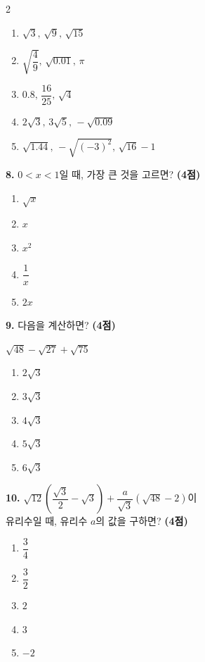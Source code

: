 \documentclass[a4paper,11pt]{article}
\newcommand{\choicenum}[1]{\textcircled{\small #1}}
\newcommand{\scorebox}[1]{\textbf{(#1점)}}
\newcommand{\qbox}[1]{%
  \begin{mdframed}[linewidth=0.8pt,innerleftmargin=6pt,innerrightmargin=6pt,innertopmargin=4pt,innerbottommargin=4pt]
  #1
  \end{mdframed}
}
\begin{document}
\begin{multicols}{2}
\begin{enumerate}[label=\protect\choicenum{\arabic*},leftmargin=*,itemsep=0pt]
  \item $\sqrt{3},\,\sqrt{9},\,\sqrt{15}$
  \item $\sqrt{\dfrac{4}{9}},\,\sqrt{0.01},\,\pi$
  \item $0.8,\,\dfrac{16}{25},\,\sqrt{4}$
  \item $2\sqrt{3},\,3\sqrt{5},\,-\sqrt{0.09}$
  \item $\sqrt{1.44},\,-\sqrt{(-3)^{2}},\,\sqrt{16}-1$
\end{enumerate}

\vspace{3mm}

\noindent\textbf{8.} $0<x<1$일 때, 가장 큰 것을 고르면? \scorebox{4}

\begin{enumerate}[label=\protect\choicenum{\arabic*},leftmargin=*,itemsep=0pt]
  \item $\sqrt{x}$
  \item $x$
  \item $x^{2}$
  \item $\dfrac{1}{x}$
  \item $2x$
\end{enumerate}

\vspace{3mm}

\noindent\textbf{9.} 다음을 계산하면? \scorebox{4}

\qbox{$\sqrt{48}-\sqrt{27}+\sqrt{75}$}

\begin{enumerate}[label=\protect\choicenum{\arabic*},leftmargin=*,itemsep=0pt]
  \item $2\sqrt{3}$
  \item $3\sqrt{3}$
  \item $4\sqrt{3}$
  \item $5\sqrt{3}$
  \item $6\sqrt{3}$
\end{enumerate}

\vspace{3mm}

\noindent\textbf{10.} $\sqrt{12}\!\left(\dfrac{\sqrt{3}}{2}-\sqrt{3}\right)+\dfrac{a}{\sqrt{3}}\!\left(\sqrt{48}-2\right)$이\\
유리수일 때, 유리수 $a$의 값을 구하면? \scorebox{4}

\begin{enumerate}[label=\protect\choicenum{\arabic*},leftmargin=*,itemsep=0pt]
  \item $\dfrac{3}{4}$
  \item $\dfrac{3}{2}$
  \item $2$
  \item $3$
  \item $-2$
\end{enumerate}


\end{multicols}
\end{document}
